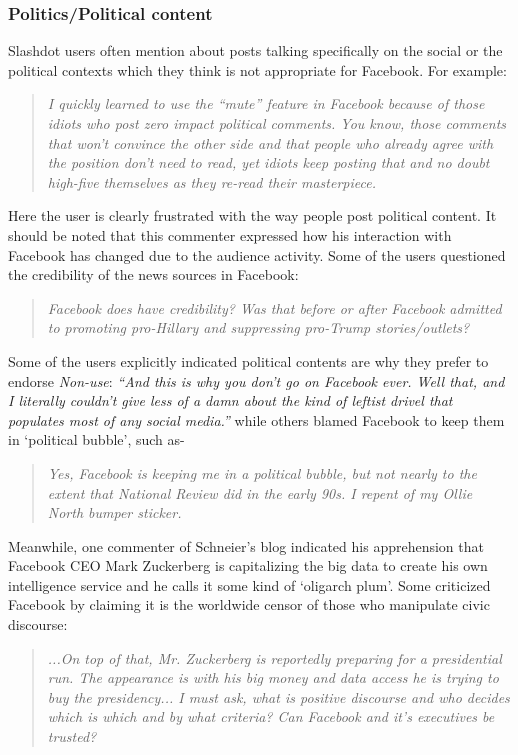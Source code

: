  \subsubsection{Politics/Political content}
 Slashdot users often mention about posts talking specifically on the social or the political contexts which they think is not appropriate for Facebook. For example:
     \begin{quote}
         \textit{I quickly learned to use the ``mute'' feature in Facebook because of those idiots who post zero impact political comments. You know, those comments that won't convince the other side and that people who already agree with the position don't need to read, yet idiots keep posting that and no doubt high-five themselves as they re-read their masterpiece.}
     \end{quote}

Here the user is clearly frustrated with the way people post political content. It should be noted that this commenter expressed how his interaction with Facebook has changed due to the audience activity. Some of the users questioned the credibility of the news sources in Facebook:
    \begin{quote}
\textit{Facebook does have credibility?
Was that before or after Facebook admitted to promoting pro-Hillary and suppressing pro-Trump stories/outlets?}
    \end{quote}
    
Some of the users explicitly indicated political contents are why they prefer to endorse \emph{Non-use}: \textit{``And this is why you don't go on Facebook ever. Well that, and I literally couldn't give less of a damn about the kind of leftist drivel that populates most of any social media.''} while others blamed Facebook to keep them in `political bubble', such as-

\begin{quote}
         \textit{ Yes, Facebook is keeping me in a political bubble, but not nearly to the extent that National Review did in the early 90s. I repent of my Ollie North bumper sticker. }
    \end{quote}
    
Meanwhile, one commenter of Schneier's blog indicated his apprehension that Facebook CEO Mark Zuckerberg is capitalizing the big data to create his own intelligence service and he calls it some kind of `oligarch plum'. Some criticized Facebook by claiming it is the worldwide censor of those who manipulate civic discourse:
\begin{quote}
         \textit{...On top of that, Mr. Zuckerberg is reportedly preparing for a presidential run. The appearance is with his big money and data access he is trying to buy the presidency... I must ask, what is positive discourse and who decides which is which and by what criteria? Can Facebook and it's executives be trusted? }
    \end{quote}

